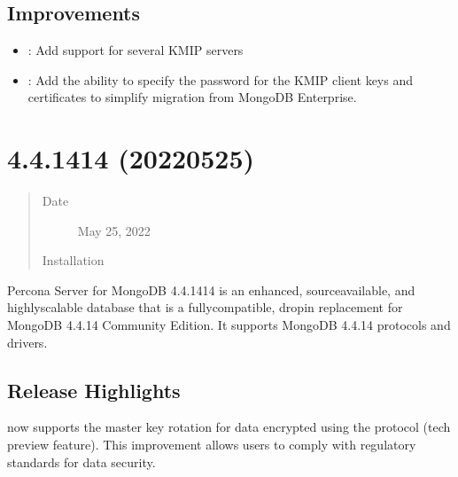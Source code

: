 \documentclass[letterpaper,10pt,english]{sphinxmanual}
\begin{document}
\subsection{Improvements}
\label{\detokenize{release_notes/4.4.15-15:improvements}}\begin{itemize}
\item {} 
\sphinxAtStartPar
{}: Add support for several KMIP servers

\item {} 
\sphinxAtStartPar
{}: Add the ability to specify the password for the KMIP client keys and certificates to simplify migration from MongoDB Enterprise.

\end{itemize}


\section{ 4.4.14\sphinxhyphen{}14 (2022\sphinxhyphen{}05\sphinxhyphen{}25)}
\label{\detokenize{release_notes/4.4.14-14:percona-server-for-mongodb-4-4-14-14-2022-05-25}}\label{\detokenize{release_notes/4.4.14-14:psmdb-4-4-14-14}}\label{\detokenize{release_notes/4.4.14-14::doc}}\begin{quote}\begin{description}
\item[{Date}] \leavevmode
\sphinxAtStartPar
May 25, 2022

\item[{Installation}] \leavevmode
\sphinxAtStartPar
{}

\end{description}\end{quote}

\sphinxAtStartPar
Percona Server for MongoDB 4.4.14\sphinxhyphen{}14 is an enhanced, source\sphinxhyphen{}available, and highly\sphinxhyphen{}scalable database that is a
fully\sphinxhyphen{}compatible, drop\sphinxhyphen{}in replacement for MongoDB 4.4.14 Community Edition.
It supports MongoDB 4.4.14 protocols and drivers.


\subsection{Release Highlights}
\label{\detokenize{release_notes/4.4.14-14:release-highlights}}
\sphinxAtStartPar
{} now supports the master key rotation for data encrypted using the  {\hyperref[\detokenize{kmip:kmip}]{}} protocol (tech preview feature). This improvement allows users to comply with regulatory standards for data security.
\end{document}
